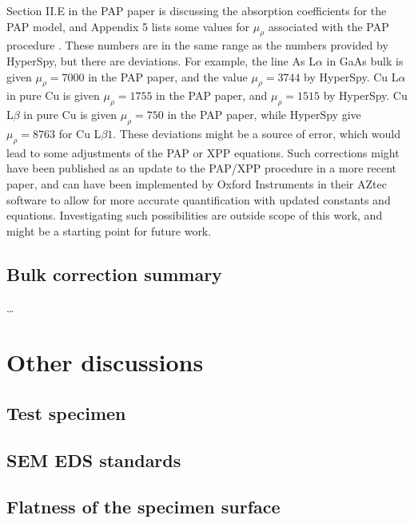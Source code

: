 Section II.E in the PAP paper is discussing the absorption coefficients for the PAP model, and Appendix 5 lists some values for $\mu_\rho$ associated with the PAP procedure \cite{pap_1991}.
These numbers are in the same range as the numbers provided by HyperSpy, but there are deviations.
For example, the line As L$\alpha$ in GaAs bulk is given $\mu_\rho = 7000$ in the PAP paper, and the value $\mu_\rho = 3744$ by HyperSpy.
Cu L$\alpha$ in pure Cu is given $\mu_\rho = 1755$ in the PAP paper, and $\mu_\rho = 1515$ by HyperSpy.
Cu L$\beta$ in pure Cu is given $\mu_\rho = 750$ in the PAP paper, while HyperSpy give $\mu_\rho = 8763$ for Cu L$\beta1$.
These deviations might be a source of error, which would lead to some adjustments of the PAP or XPP equations.
Such corrections might have been published as an update to the PAP/XPP procedure in a more recent paper, and can have been implemented by Oxford Instruments in their AZtec software to allow for more accurate quantification with updated constants and equations.
Investigating such possibilities are outside scope of this work, and might be a starting point for future work.



\subsection{Bulk correction summary}
\label{discussion:bulk_corrections:summary}

\dots










\section{Other discussions}
\label{discussion:other}

\subsection{Test specimen}
\label{discussion:other:test_specimen}

\subsection{SEM EDS standards}
\label{discussion:other:sem_eds_standards}

\subsection{Flatness of the specimen surface}
\label{discussion:other:flatness}

